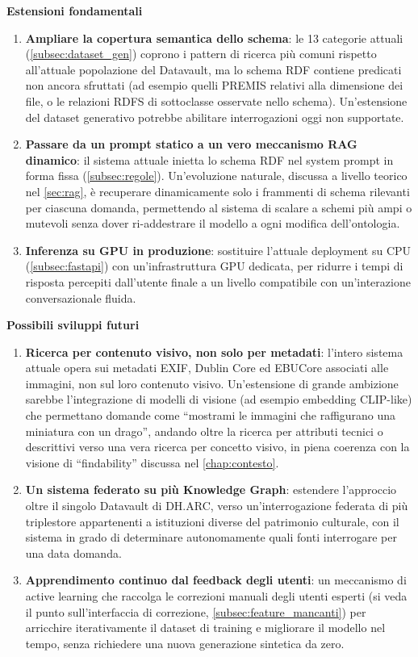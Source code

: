 \textbf{Estensioni fondamentali}\label{subsec:estensioni_fondamentali}

\begin{enumerate}
    \item \textbf{Ampliare la copertura semantica dello schema}: le 13 categorie attuali (\cref{subsec:dataset_gen}) coprono i pattern di ricerca più comuni rispetto all'attuale popolazione del Datavault, ma lo schema RDF contiene predicati non ancora sfruttati (ad esempio quelli PREMIS relativi alla dimensione dei file, o le relazioni RDFS di sottoclasse osservate nello schema). Un'estensione del dataset generativo potrebbe abilitare interrogazioni oggi non supportate.
    \item \textbf{Passare da un prompt statico a un vero meccanismo RAG dinamico}: il sistema attuale inietta lo schema RDF nel system prompt in forma fissa (\cref{subsec:regole}). Un'evoluzione naturale, discussa a livello teorico nel \cref{sec:rag}, è recuperare dinamicamente solo i frammenti di schema rilevanti per ciascuna domanda, permettendo al sistema di scalare a schemi più ampi o mutevoli senza dover ri-addestrare il modello a ogni modifica dell'ontologia.
    \item \textbf{Inferenza su GPU in produzione}: sostituire l'attuale deployment su CPU (\cref{subsec:fastapi}) con un'infrastruttura GPU dedicata, per ridurre i tempi di risposta percepiti dall'utente finale a un livello compatibile con un'interazione conversazionale fluida.
\end{enumerate}

\textbf{Possibili sviluppi futuri}\label{subsec:sviluppi_futuri}

\begin{enumerate}
    \item \textbf{Ricerca per contenuto visivo, non solo per metadati}: l'intero sistema attuale opera sui metadati EXIF, Dublin Core ed EBUCore associati alle immagini, non sul loro contenuto visivo. Un'estensione di grande ambizione sarebbe l'integrazione di modelli di visione (ad esempio embedding CLIP-like) che permettano domande come ``mostrami le immagini che raffigurano una miniatura con un drago'', andando oltre la ricerca per attributi tecnici o descrittivi verso una vera ricerca per concetto visivo, in piena coerenza con la visione di ``findability'' discussa nel \cref{chap:contesto}.
    \item \textbf{Un sistema federato su più Knowledge Graph}: estendere l'approccio oltre il singolo Datavault di DH.ARC, verso un'interrogazione federata di più triplestore appartenenti a istituzioni diverse del patrimonio culturale, con il sistema in grado di determinare autonomamente quali fonti interrogare per una data domanda.
    \item \textbf{Apprendimento continuo dal feedback degli utenti}: un meccanismo di active learning che raccolga le correzioni manuali degli utenti esperti (si veda il punto sull'interfaccia di correzione, \cref{subsec:feature_mancanti}) per arricchire iterativamente il dataset di training e migliorare il modello nel tempo, senza richiedere una nuova generazione sintetica da zero.
\end{enumerate}


